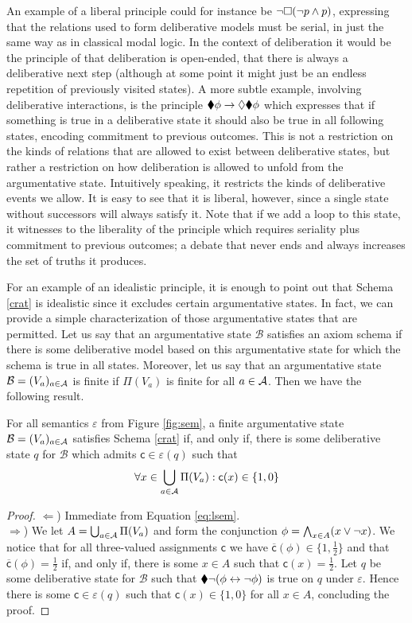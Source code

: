 \documentclass[greybox]{svmult}
\renewcommand{\bar}[1]{\overline{#1}}
\newcommand{\clab}{\mathsf c}
\newcommand{\views}{\mathcal B}
\newcommand{\sem}{\varepsilon}
\begin{document}
An example of a liberal principle could for instance be $\neg \square (\neg p \land p)$, expressing that the relations used to form deliberative models must be serial, in just the same way as in classical modal logic. In the context of deliberation it would be the principle of that deliberation is open-ended, that there is always a deliberative next step (although at some point it might just be an endless repetition of previously visited states). A more subtle example, involving deliberative interactions, is the principle $\blacklozenge \phi \to \lozenge \blacklozenge \phi$ which expresses that if something is true in a deliberative state it should also be true in all following states, encoding commitment to previous outcomes. This is not a restriction on the kinds of relations that are allowed to exist between deliberative states, but rather a restriction on how deliberation is allowed to unfold from the argumentative state. Intuitively speaking, it restricts the kinds of deliberative events we allow. It is easy to see that it is liberal, however, since a single state without successors will always satisfy it. Note that if we add a loop to this state, it witnesses to the liberality of the principle which requires seriality plus commitment to previous outcomes; a debate that never ends and always increases the set of truths it produces.

For an example of an idealistic principle, it is enough to point out that Schema \ref{crat} is idealistic since it excludes certain argumentative states. In fact, we can provide a simple characterization of those argumentative states that are permitted. Let us say that an argumentative state $\views$ satisfies an axiom schema if there is some deliberative model based on this argumentative state for which the schema is true in all states. Moreover, let us say that an argumentative state $\views = (V_a)_{a \in \agents}$ is finite if $\Pi(V_a)$ is finite for all $a \in \mathcal A$. Then we have the following result.

\begin{theorem}\label{thm:1}
For all semantics $\sem$ from Figure \ref{fig:sem}, a finite argumentative state $\views = (V_a)_{a \in \agents}$ satisfies Schema \ref{crat} if, and only if, there is some deliberative state $q$ for $\views$ which admits $\clab \in \sem(q)$ such that
$$
\forall x \in \bigcup_{a \in \agents}\Pi(V_a): \clab(x) \in \{1,0\}
$$
\end{theorem}

\begin{proof}
$\Leftarrow$) Immediate from Equation \ref{eq:lsem}. \\
$\Rightarrow$) We let $A = \bigcup_{a \in \mathcal A}\Pi(V_a)$ and form the conjunction $\phi = \bigwedge_{x \in A}(x \lor \neg x)$. We notice that for all three-valued assignments $\clab$ we have $\bar \clab(\phi) \in \{1,\frac{1}{2}\}$ and that $\bar \clab(\phi) = \frac{1}{2}$ if, and only if, there is some $x \in A$ such that $\clab(x) = \frac{1}{2}$. Let $q$ be some deliberative state for $\views$ such that $\blacklozenge \neg (\phi \leftrightarrow \neg \phi)$ is true on 
$q$ under $\sem$. Hence there is some $\clab \in \sem(q)$ such that $\clab(x) \in \{1,0\}$ for all $x \in A$, concluding the proof.
\end{proof}
\end{document}
